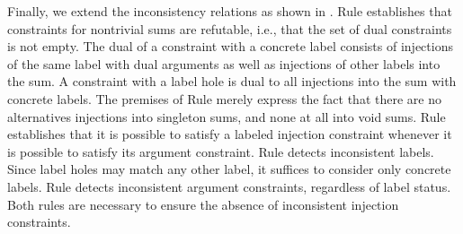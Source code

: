 

Finally, we extend the inconsistency relations as shown in .
Rule \RInjMult establishes that constraints for nontrivial sums are refutable, i.e., that the set of dual constraints is not empty.
The dual of a constraint with a concrete label consists of injections of the same label with dual arguments as well as injections of other labels into the sum.
A constraint with a label hole is dual to all injections into the sum with concrete labels.
The premises of Rule \RInjSing merely express the fact that there are no alternatives injections into singleton sums, and none at all into void sums.
Rule \PTInj establishes that it is possible to satisfy a labeled injection constraint whenever it is possible to satisfy its argument constraint.
Rule \CINCInjTag detects inconsistent labels.
Since label holes may match any other label, it suffices to consider only concrete labels.
Rule \CINCInjArg detects inconsistent argument constraints, regardless of label status.
Both rules are necessary to ensure the absence of inconsistent injection constraints.


